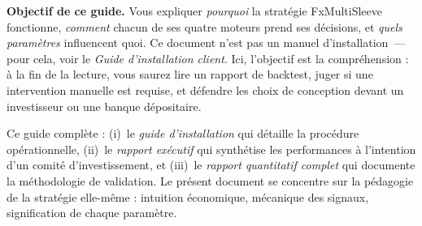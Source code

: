 \documentclass[11pt, a4paper]{scrartcl}
\begin{document}
\vspace{0.8cm}

\begin{thesisbox}
\textbf{Objectif de ce guide.} Vous expliquer \emph{pourquoi} la stratégie
FxMultiSleeve fonctionne, \emph{comment} chacun de ses quatre moteurs prend ses
décisions, et \emph{quels paramètres} influencent quoi. Ce document n'est pas un
manuel d'installation~--- pour cela, voir le \emph{Guide d'installation client}.
Ici, l'objectif est la compréhension : à la fin de la lecture, vous saurez lire
un rapport de backtest, juger si une intervention manuelle est requise, et
défendre les choix de conception devant un investisseur ou une banque dépositaire.
\end{thesisbox}

\vspace{0.4cm}

{\small\color{slateGrey}\sffamily
Ce guide complète : (i)~le \emph{guide d'installation} qui détaille la procédure
opérationnelle, (ii)~le \emph{rapport exécutif} qui synthétise les performances
à l'intention d'un comité d'investissement, et (iii)~le \emph{rapport
quantitatif complet} qui documente la méthodologie de validation. Le présent
document se concentre sur la pédagogie de la stratégie elle-même : intuition
économique, mécanique des signaux, signification de chaque paramètre.}

\vfill

\noindent\colorbox{lightGrey}{%
}

\newpage

{\hypersetup{linkcolor=primary}
\renewcommand{\contentsname}{\sffamily\Large\bfseries\color{primary}Table des matières}
\tableofcontents}


\end{document}
